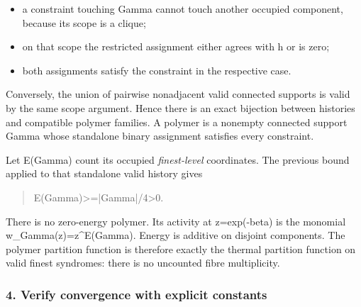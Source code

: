 \documentclass[
]{article}
\newcounter{none} %
\providecommand{\tightlist}{%
  \setlength{\itemsep}{0pt}\setlength{\parskip}{0pt}}
\begin{document}
\begin{itemize}
\tightlist
\item
  a constraint touching Gamma cannot touch another occupied component,
  because its scope is a clique;
\item
  on that scope the restricted assignment either agrees with h or is
  zero;
\item
  both assignments satisfy the constraint in the respective case.
\end{itemize}

Conversely, the union of pairwise nonadjacent valid connected supports
is valid by the same scope argument. Hence there is an exact bijection
between histories and compatible polymer families. A polymer is a
nonempty connected support Gamma whose standalone binary assignment
satisfies every constraint.

Let E(Gamma) count its occupied \emph{finest-level} coordinates. The
previous bound applied to that standalone valid history gives

\begin{quote}\small\ttfamily\raggedright\setlength{\parskip}{0pt}
\noindent E\allowbreak{}(\allowbreak{}G\allowbreak{}a\allowbreak{}m\allowbreak{}m\allowbreak{}a\allowbreak{})\allowbreak{}\hspace*{0.525em}\allowbreak{}>\allowbreak{}=\allowbreak{}\hspace*{0.525em}\allowbreak{}|\allowbreak{}G\allowbreak{}a\allowbreak{}m\allowbreak{}m\allowbreak{}a\allowbreak{}|\allowbreak{}/\allowbreak{}4\allowbreak{}\hspace*{0.525em}\allowbreak{}>\allowbreak{}\hspace*{0.525em}\allowbreak{}0\allowbreak{}.\par
\end{quote}

There is no zero-energy polymer. Its activity at z=exp(-beta) is the
monomial
w\allowbreak{}\_\allowbreak{}G\allowbreak{}a\allowbreak{}m\allowbreak{}m\allowbreak{}a\allowbreak{}(\allowbreak{}z\allowbreak{})\allowbreak{}=\allowbreak{}z\allowbreak{}\^{}\allowbreak{}E\allowbreak{}(\allowbreak{}G\allowbreak{}a\allowbreak{}m\allowbreak{}m\allowbreak{}a\allowbreak{})\allowbreak{}.
Energy is additive on disjoint components. The polymer partition
function is therefore exactly the thermal partition function on valid
finest syndromes: there is no uncounted fibre multiplicity.

\subsubsection{4. Verify convergence with explicit
constants}\label{verify-convergence-with-explicit-constants}
\end{document}
